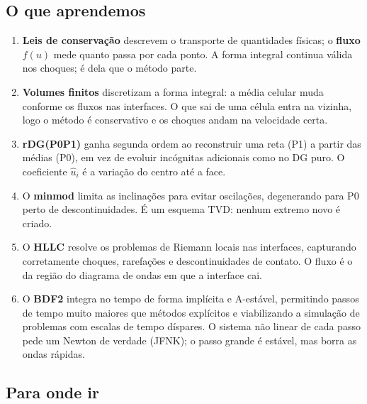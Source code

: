 \documentclass[10pt,a4paper]{article}
\newcommand{\uh}{\hat u}
\begin{document}
\subsection{O que aprendemos}
\begin{enumerate}[leftmargin=2.5em,itemsep=3pt]
\item \textbf{Leis de conservação} descrevem o transporte de quantidades físicas; o \textbf{fluxo} $f(u)$ mede quanto passa por cada ponto. A forma integral continua válida nos choques; é dela que o método parte.
\item \textbf{Volumes finitos} discretizam a forma integral: a média celular muda conforme os fluxos nas interfaces. O que sai de uma célula entra na vizinha, logo o método é conservativo e os choques andam na velocidade certa.
\item \textbf{rDG(P0P1)} ganha segunda ordem ao reconstruir uma reta (P1) a partir das médias (P0), em vez de evoluir incógnitas adicionais como no DG puro. O coeficiente $\uh_i$ é a variação do centro até a face.
\item O \textbf{minmod} limita as inclinações para evitar oscilações, degenerando para P0 perto de descontinuidades. É um esquema TVD: nenhum extremo novo é criado.
\item O \textbf{HLLC} resolve os problemas de Riemann locais nas interfaces, capturando corretamente choques, rarefações e descontinuidades de contato. O fluxo é o da região do diagrama de ondas em que a interface cai.
\item O \textbf{BDF2} integra no tempo de forma implícita e A-estável, permitindo passos de tempo muito maiores que métodos explícitos e viabilizando a simulação de problemas com escalas de tempo díspares. O sistema não linear de cada passo pede um Newton de verdade (JFNK); o passo grande é estável, mas borra as ondas rápidas.
\end{enumerate}

\subsection{Para onde ir}
\end{document}
